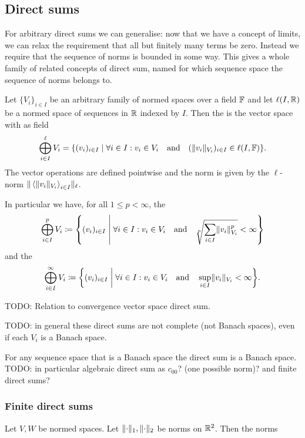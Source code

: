 \subsection{Direct sums}

For arbitrary direct sums we can generalise: now that we have a concept of limits, we can relax the requirement that all but finitely many terms be zero. Instead we require that the sequence of norms is bounded in some way. This gives a whole family of related concepts of direct sum, named for which sequence space the sequence of norms belongs to.
\begin{definition}
Let $\{V_i\}_{i\in I}$ be an arbitrary family of normed spaces over a field $\mathbb{F}$ and let $\ell(I,\mathbb{R})$ be a normed space of sequences in $\mathbb{R}$ indexed by $I$. Then the  is the vector space with as field
\[ \bigoplus_{i\in I}^\ell V_i = \setbuilder{(v_i)_{i\in I}}{\forall i\in I: v_i\in V_i \quad\text{and}\quad (\norm{v_i}_{V_i})_{i\in I}\in \ell(I,\F) }. \]
The vector operations are defined pointwise and the norm is given by the $\ell$-norm $\lVert\big. \left\langle \lVert v_i\rVert_{V_i} \right\rangle_{i\in I}\rVert_\ell$.

In particular we have, for all $1\leq p<\infty$, the 
\[ \bigoplus_{i\in I}^p V_i \defeq \setbuilder{(v_i)_{i\in I}}{\forall i\in I: v_i\in V_i \quad\text{and}\quad \sqrt[p]{\sum_{i\in I}\norm{v_i}_{V_i}^p}<\infty} \]
and the 
\[ \bigoplus_{i\in I}^\infty V_i \defeq \setbuilder{(v_i)_{i\in I}}{\forall i\in I: v_i\in V_i \quad\text{and}\quad \sup_{i\in I}\norm{v_i}_{V_i}<\infty}. \]
\end{definition}

TODO: Relation to convergence vector space direct sum.

TODO: in general these direct sums are not complete (not Banach spaces), even if each $V_i$ is a Banach space.

\begin{proposition}
For any sequence space that is a Banach space the direct sum is a Banach space. TODO: in particular algebraic direct sum as $c_{00}$? (one possible norm)? and finite direct sums?
\end{proposition}

\subsubsection{Finite direct sums}

\begin{proposition}
Let $V,W$ be normed spaces. Let $\lVert\cdot\rVert_1, \lVert\cdot\rVert_2$ be norms on $\mathbb{R}^2$. Then the norms
\end{proposition}




